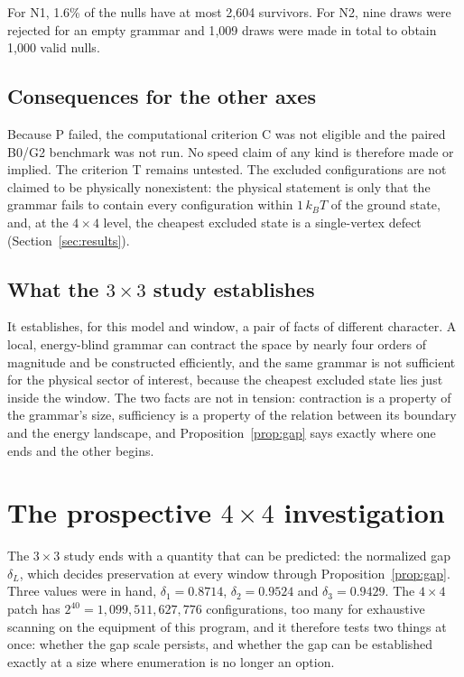 \documentclass[11pt,a4paper]{article}
\theoremstyle{plain}
\theoremstyle{definition}
\theoremstyle{remark}
\newcommand{\kBT}{k_{B}T}
\begin{document}
For N1, 1.6\% of the nulls have at most 2{,}604 survivors. For N2, nine draws were rejected for an empty grammar and 1{,}009 draws were made in total to obtain 1{,}000 valid nulls.

\subsection{Consequences for the other axes}
Because P failed, the computational criterion C was not eligible and the paired B0/G2 benchmark was not run. No speed claim of any kind is therefore made or implied. The criterion T remains untested. The excluded configurations are not claimed to be physically nonexistent: the physical statement is only that the grammar fails to contain every configuration within $1\,\kBT$ of the ground state, and, at the $4\times4$ level, the cheapest excluded state is a single-vertex defect (Section~\ref{sec:results}).

\subsection{What the $3\times3$ study establishes}
It establishes, for this model and window, a pair of facts of different character. A local, energy-blind grammar can contract the space by nearly four orders of magnitude and be constructed efficiently, and the same grammar is not sufficient for the physical sector of interest, because the cheapest excluded state lies just inside the window. The two facts are not in tension: contraction is a property of the grammar's size, sufficiency is a property of the relation between its boundary and the energy landscape, and Proposition~\ref{prop:gap} says exactly where one ends and the other begins.

\section{The prospective $4\times4$ investigation}\label{sec:prospective}

The $3\times3$ study ends with a quantity that can be predicted: the normalized gap $\delta_L$, which decides preservation at every window through Proposition~\ref{prop:gap}. Three values were in hand, $\delta_1=0.8714$, $\delta_2=0.9524$ and $\delta_3=0.9429$. The $4\times4$ patch has $2^{40}=1{,}099{,}511{,}627{,}776$ configurations, too many for exhaustive scanning on the equipment of this program, and it therefore tests two things at once: whether the gap scale persists, and whether the gap can be established exactly at a size where enumeration is no longer an option.
\end{document}
